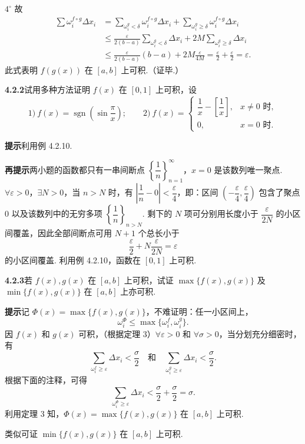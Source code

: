 \documentclass[UTF8, 12pt, fontset=fandol, oneside]{ctexart}
\begin{document}
$4^\circ$ 故
\[
\begin{aligned}
\sum\omega_i^{f\circ g}\Delta x_i
&=\sum_{\omega_i^g<\delta}\omega_i^{f\circ g}\Delta x_i
+\sum_{\omega_i^g\ge\delta}\omega_i^{f\circ g}\Delta x_i\\
&\le \frac{\varepsilon}{2(b-a)}\sum_{\omega_i^g<\delta}\Delta x_i
+2M\sum_{\omega_i^g\ge\delta}\Delta x_i\\
&\le \frac{\varepsilon}{2(b-a)}(b-a)+2M\frac{\varepsilon}{4M}
=\frac{\varepsilon}{2}+\frac{\varepsilon}{2}=\varepsilon.
\end{aligned}
\]
此式表明 $f(g(x))$ 在 $[a,b]$ 上可积.（证毕.）

\noindent\textbf{4.2.2}\quad 试用多种方法证明 $f(x)$ 在 $[0,1]$ 上可积，设
\[
1)\ f(x)=\operatorname{sgn}\left(\sin\frac{\pi}{x}\right);\qquad
2)\ f(x)=
\begin{cases}
\dfrac1x-\left[\dfrac1x\right], & x\ne0\text{ 时},\\
0, & x=0\text{ 时}.
\end{cases}
\]

\noindent\textbf{提示}\quad 利用例 4.2.10.

\noindent\textbf{再提示}\quad 两小题的函数都只有一串间断点 $\left\{\dfrac1n\right\}_{n=1}^\infty$，$x=0$ 是该数列唯一聚点. $\forall\varepsilon>0$，$\exists N>0$，当 $n>N$ 时，有 $\left|\dfrac1n-0\right|<\dfrac{\varepsilon}{4}$，即：区间 $\left(-\dfrac{\varepsilon}{4},\dfrac{\varepsilon}{4}\right)$ 包含了聚点 0 以及该数列中的无穷多项 $\left\{\dfrac1n\right\}_{n>N}$. 剩下的 $N$ 项可分别用长度小于 $\dfrac{\varepsilon}{2N}$ 的小区间覆盖，因此全部间断点可用 $N+1$ 个总长小于
\[
\frac{\varepsilon}{2}+N\frac{\varepsilon}{2N}=\varepsilon
\]
的小区间覆盖. 利用例 4.2.10，函数在 $[0,1]$ 上可积.

\noindent\textbf{4.2.3}\quad 若 $f(x),g(x)$ 在 $[a,b]$ 上可积，试证 $\max\{f(x),g(x)\}$ 及 $\min\{f(x),g(x)\}$ 在 $[a,b]$ 上亦可积.

\noindent\textbf{提示}\quad 记 $\Phi(x)=\max\{f(x),g(x)\}$，不难证明：任一小区间上，
\[
\omega_i^\Phi\le\max\{\omega_i^f,\omega_i^g\}.
\tag{1}
\]
因 $f(x)$ 和 $g(x)$ 可积，（根据定理 3）$\forall\varepsilon>0$ 和 $\forall\sigma>0$，当分划充分细密时，有
\[
\sum_{\omega_i^f\ge\varepsilon}\Delta x_i<\frac{\sigma}{2}
\quad\text{和}\quad
\sum_{\omega_i^g\ge\varepsilon}\Delta x_i<\frac{\sigma}{2}.
\]
根据下面的注释，可得
\[
\sum_{\omega_i^\Phi\ge\varepsilon}\Delta x_i<\frac{\sigma}{2}+\frac{\sigma}{2}=\sigma.
\]
利用定理 3 知，$\Phi(x)=\max\{f(x),g(x)\}$ 在 $[a,b]$ 上可积.

类似可证 $\min\{f(x),g(x)\}$ 在 $[a,b]$ 上可积.
\end{document}
